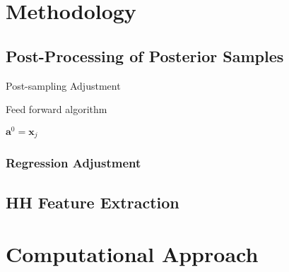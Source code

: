 \chapter{Methodology}\label{chap:methodology}

\section{Post-Processing of Posterior Samples}\label{sec:post_processing}

Post-sampling Adjustment

\begin{algorithm}[H]
\caption{Feed forward algorithm}
\label{alg:FeedForward}
\begin{algorithmic}[1] 

        \State $\mathbf{a}^0 = \mathbf{x}_j$\;
\EndFor

\end{algorithmic}
\end{algorithm}

\subsection{Regression Adjustment}\label{sec:reg_adjust}

\section{HH Feature Extraction}\label{sec:hh_feature_extract}

\chapter{Computational Approach}\label{chap:computational}

